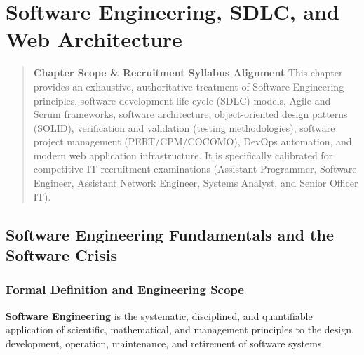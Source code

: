 \chapter{Software Engineering, SDLC, and Web Architecture}
\label{ch:software_engineering}

\begin{quote}
\textbf{Chapter Scope \& Recruitment Syllabus Alignment}
This chapter provides an exhaustive, authoritative treatment of Software Engineering principles, software development life cycle (SDLC) models, Agile and Scrum frameworks, software architecture, object-oriented design patterns (SOLID), verification and validation (testing methodologies), software project management (PERT/CPM/COCOMO), DevOps automation, and modern web application infrastructure. It is specifically calibrated for competitive IT recruitment examinations (Assistant Programmer, Software Engineer, Assistant Network Engineer, Systems Analyst, and Senior Officer IT).
\end{quote}

\section{Software Engineering Fundamentals and the Software Crisis}
\label{sec:se_fundamentals}

\subsection{Formal Definition and Engineering Scope}
\textbf{Software Engineering} is the systematic, disciplined, and quantifiable application of scientific, mathematical, and management principles to the design, development, operation, maintenance, and retirement of software systems. 

